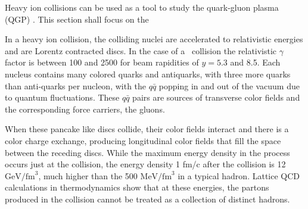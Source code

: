 Heavy ion collisions can be used as a tool to study the quark-gluon plasma (QGP) \cite{SHURYAK198071}. This section shall focus on the 


In a heavy ion collision, the colliding nuclei are accelerated to relativistic energies and are Lorentz contracted discs. In the case of a \pbpb\ collision
the relativistic $\gamma$ factor is between 100 and 2500 for beam rapidities of $y = 5.3$ and 8.5. Each nucleus contains many colored quarks and
antiquarks, with three more quarks than anti-quarks per nucleon, with the $q\bar{q}$ popping in and out of the vacuum due to quantum fluctuations.
These $q\bar{q}$ pairs are sources of transverse color fields and the corresponding force carriers, the gluons. 

When these pancake like discs collide, their color fields interact and there is a color charge exchange, producing longitudinal color fields that fill 
the space between the receding discs. While the maximum energy density in the process occurs just at the collision, the energy density 1 fm/c 
after the collision is 12 $\mathrm{GeV} / \mathrm{fm}^3$, much higher than the 500 $\mathrm{MeV} / \mathrm{fm}^3$ in a typical hadron. Lattice
QCD calculations in thermodynamics show that at these energies, the partons produced in the collision cannot be treated as a collection of distinct hadrons. 





